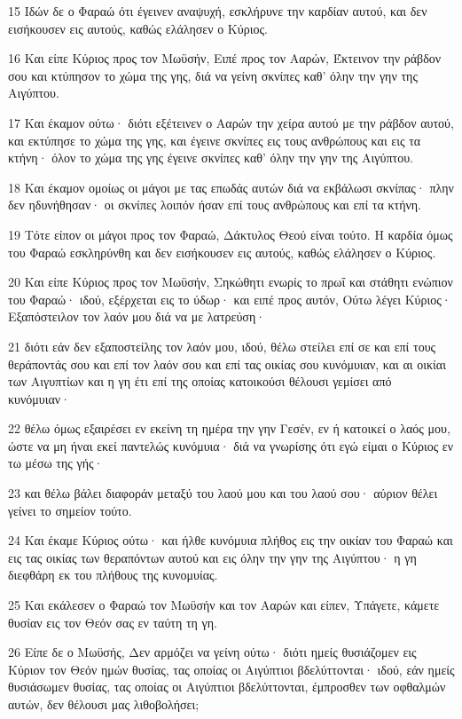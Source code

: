 \par 15 Ιδών δε ο Φαραώ ότι έγεινεν αναψυχή, εσκλήρυνε την καρδίαν αυτού, και δεν εισήκουσεν εις αυτούς, καθώς ελάλησεν ο Κύριος.
\par 16 Και είπε Κύριος προς τον Μωϋσήν, Ειπέ προς τον Ααρών, Έκτεινον την ράβδον σου και κτύπησον το χώμα της γης, διά να γείνη σκνίπες καθ' όλην την γην της Αιγύπτου.
\par 17 Και έκαμον ούτω· διότι εξέτεινεν ο Ααρών την χείρα αυτού με την ράβδον αυτού, και εκτύπησε το χώμα της γης, και έγεινε σκνίπες εις τους ανθρώπους και εις τα κτήνη· όλον το χώμα της γης έγεινε σκνίπες καθ' όλην την γην της Αιγύπτου.
\par 18 Και έκαμον ομοίως οι μάγοι με τας επωδάς αυτών διά να εκβάλωσι σκνίπας· πλην δεν ηδυνήθησαν· οι σκνίπες λοιπόν ήσαν επί τους ανθρώπους και επί τα κτήνη.
\par 19 Τότε είπον οι μάγοι προς τον Φαραώ, Δάκτυλος Θεού είναι τούτο. Η καρδία όμως του Φαραώ εσκληρύνθη και δεν εισήκουσεν εις αυτούς, καθώς ελάλησεν ο Κύριος.
\par 20 Και είπε Κύριος προς τον Μωϋσήν, Σηκώθητι ενωρίς το πρωΐ και στάθητι ενώπιον του Φαραώ· ιδού, εξέρχεται εις το ύδωρ· και ειπέ προς αυτόν, Ούτω λέγει Κύριος· Εξαπόστειλον τον λαόν μου διά να με λατρεύση·
\par 21 διότι εάν δεν εξαποστείλης τον λαόν μου, ιδού, θέλω στείλει επί σε και επί τους θεράποντάς σου και επί τον λαόν σου και επί τας οικίας σου κυνόμυιαν, και αι οικίαι των Αιγυπτίων και η γη έτι επί της οποίας κατοικούσι θέλουσι γεμίσει από κυνόμυιαν·
\par 22 θέλω όμως εξαιρέσει εν εκείνη τη ημέρα την γην Γεσέν, εν ή κατοικεί ο λαός μου, ώστε να μη ήναι εκεί παντελώς κυνόμυια· διά να γνωρίσης ότι εγώ είμαι ο Κύριος εν τω μέσω της γής·
\par 23 και θέλω βάλει διαφοράν μεταξύ του λαού μου και του λαού σου· αύριον θέλει γείνει το σημείον τούτο.
\par 24 Και έκαμε Κύριος ούτω· και ήλθε κυνόμυια πλήθος εις την οικίαν του Φαραώ και εις τας οικίας των θεραπόντων αυτού και εις όλην την γην της Αιγύπτου· η γη διεφθάρη εκ του πλήθους της κυνομυίας.
\par 25 Και εκάλεσεν ο Φαραώ τον Μωϋσήν και τον Ααρών και είπεν, Υπάγετε, κάμετε θυσίαν εις τον Θεόν σας εν ταύτη τη γη.
\par 26 Είπε δε ο Μωϋσής, Δεν αρμόζει να γείνη ούτω· διότι ημείς θυσιάζομεν εις Κύριον τον Θεόν ημών θυσίας, τας οποίας οι Αιγύπτιοι βδελύττονται· ιδού, εάν ημείς θυσιάσωμεν θυσίας, τας οποίας οι Αιγύπτιοι βδελύττονται, έμπροσθεν των οφθαλμών αυτών, δεν θέλουσι μας λιθοβολήσει;
